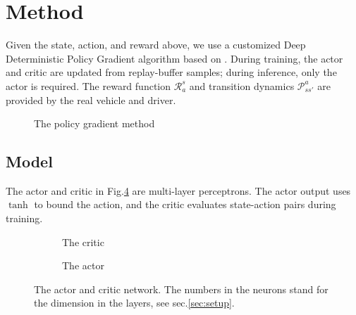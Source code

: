 \documentclass[conference]{IEEEtran}
\begin{document}
\section{Method}\label{sec:method}

Given the state, action, and reward above, we use a customized Deep Deterministic Policy Gradient algorithm \parencite{lillicrap15:_contin} based on \parencite{keras20:DDPG}. During training, the actor and critic are updated from replay-buffer samples; during inference, only the actor is required. The reward function $\mathcal{R}_a^s$ and transition dynamics $\mathcal{P}_{ss'}^{a}$ are provided by the real vehicle and driver.

\begin{figure}[ht]
	\centering
	\def\svgwidth{0.8\columnwidth}
	
	\caption{\label{fig:rl_model} The policy gradient method}\label{fig:policy gradient}
\end{figure}

\subsection{Model}\label{sec:model}

The actor and critic in Fig.\@\ref{fig:actorcritic} are multi-layer perceptrons. The actor output uses $\tanh$ to bound the action, and the critic evaluates state-action pairs during training.

\begin{figure}[ht]
	\centering
	\begin{subfigure}[b]{0.54\columnwidth}
		\centering
		\def\svgwidth{\columnwidth}
		
		\caption{\label{fig:critic} The critic}
	\end{subfigure}
	\begin{subfigure}[b]{0.44\columnwidth}
		\centering
		\def\svgwidth{\columnwidth}
		
		\caption{\label{fig:actor} The actor}
	\end{subfigure}
	\caption{The actor and critic network. The numbers in the neurons stand for the dimension in the layers, see sec.\@\ref{sec:setup}.}\label{fig:actorcritic}
\end{figure}


%	
%	
\end{document}
